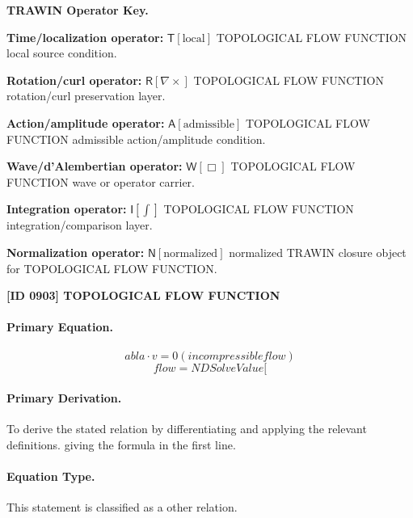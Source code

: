 \par\vspace{0.45\baselineskip}
\noindent\begin{minipage}[t]{\linewidth}
\begingroup
\small
\raggedright
\textbf{TRAWIN Operator Key.}\par
\noindent\textbf{Time/localization operator:} $\mathsf{T}\!\left[\mathrm{local}\right]$ TOPOLOGICAL FLOW FUNCTION local source condition.\par
\noindent\textbf{Rotation/curl operator:} $\mathsf{R}\!\left[\nabla\times\right]$ TOPOLOGICAL FLOW FUNCTION rotation/curl preservation layer.\par
\noindent\textbf{Action/amplitude operator:} $\mathsf{A}\!\left[\mathrm{admissible}\right]$ TOPOLOGICAL FLOW FUNCTION admissible action/amplitude condition.\par
\noindent\textbf{Wave/d'Alembertian operator:} $\mathsf{W}\!\left[\Box\right]$ TOPOLOGICAL FLOW FUNCTION wave or operator carrier.\par
\noindent\textbf{Integration operator:} $\mathsf{I}\!\left[\int\right]$ TOPOLOGICAL FLOW FUNCTION integration/comparison layer.\par
\noindent\textbf{Normalization operator:} $\mathsf{N}\!\left[\mathrm{normalized}\right]$ normalized TRAWIN closure object for TOPOLOGICAL FLOW FUNCTION.\par
\endgroup
\end{minipage}

\clearpage
\noindent\textbf{[ID 0903] TOPOLOGICAL FLOW FUNCTION}\par
\vspace{0.35em}
\paragraph{Primary Equation.}
\[
abla \cdot v = 0 (incompressible flow)
\]
\[
flow = NDSolveValue[
\]

\paragraph{Primary Derivation.}
To derive the stated relation by differentiating and applying the relevant definitions. giving the formula in the first line.
\paragraph{Equation Type.}
This statement is classified as a other relation.

